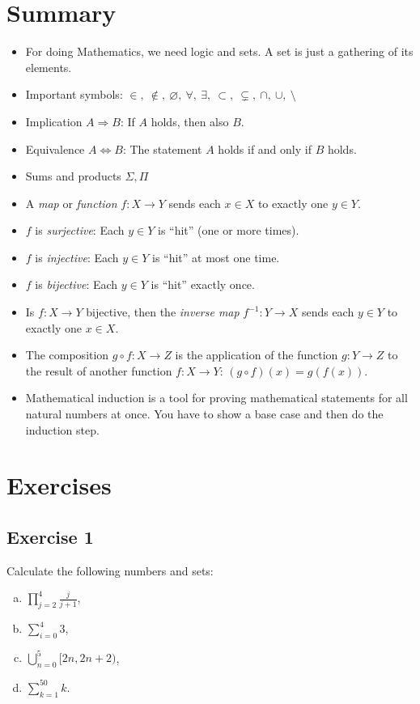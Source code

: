 \section{Summary}
\begin{itemize}
	\item For doing Mathematics, we need logic and sets. A set
	is just a gathering of its elements.
\item Important symbols: $\in,\ \not\in,\ \varnothing,\ \forall,\ \exists,\ \subset,\ \subsetneq,\ \cap,\ \cup,\ \setminus$
\item Implication $A\Rightarrow B$: If $A$ holds, then also $B$.
\item Equivalence $A\Leftrightarrow B$: The statement $A$
holds if and only if $B$ holds.
\item Sums and products $\Sigma, \Pi$
\item A \textsl{map} or \textsl{function} $f:X\to Y$ 
sends each $x\in X$ to exactly one $y\in Y$.
\white{40mm}{}
\item $f$ is  \textsl{surjective}: Each $y\in Y$ is ``hit'' (one or more times).
\item $f$ is  \textsl{injective}: Each $y\in Y$ is ``hit'' at most one time.
\item $f$ is \textsl{bijective}: Each $y\in Y$ is  ``hit'' exactly once.
\item Is $f:X\to Y$ bijective, then the \textsl{inverse map} $f^{-1}:Y\to X$ sends each $y\in Y$ to exactly one $x\in X$.
\item The composition $g\circ f:X\to Z$ is the application 
of the function $g:Y\to Z$ to the result of another function $f:X\to Y$:
$(g\circ f)(x)=g(f(x))$.
\item Mathematical induction is a tool for proving mathematical statements for
all natural numbers at once. You have to show a base case and then do the induction step.
\end{itemize}


\section{Exercises}
\subsection*{Exercise 1}
	Calculate the following numbers and sets:
	\begin{multicols}{4}
		\begin{enumerate}[(a)]
			\item
			$\prod\limits_{j=2}^{4} \frac{j}{j+1}$, 
			
			\item
			$\sum\limits_{i=0}^{4} 3$, 
			
			\item
			$\bigcup\limits_{n=0}^{5} [2n, 2n+2)$, 
			
			\item
			$\sum\limits_{k=1}^{50}k$. 
		\end{enumerate}
	\end{multicols}

